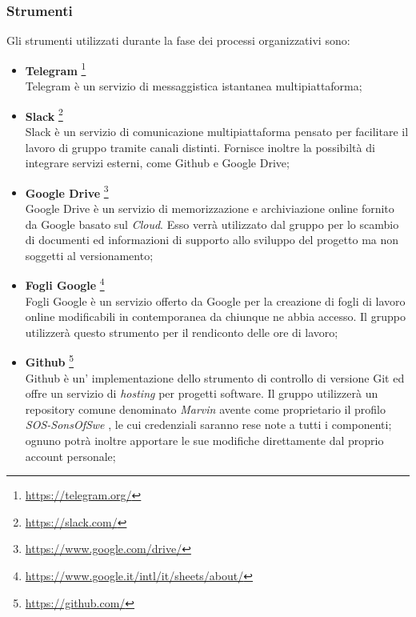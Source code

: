 \subsubsection{Strumenti}
Gli strumenti utilizzati durante la fase dei processi organizzativi sono:
\begin{itemize}
\item \textbf{Telegram}	\footnote{\href{https://telegram.org/}{https://telegram.org/}}
	~\\Telegram è un servizio di messaggistica istantanea multipiattaforma;
	
\item \textbf{Slack} \footnote{\href{https://slack.com/}{https://slack.com/}}
	~\\Slack è un servizio di comunicazione multipiattaforma pensato per facilitare il lavoro di gruppo tramite canali distinti. Fornisce inoltre la possibiltà di integrare servizi esterni, come Github e Google Drive;

\item \textbf{Google Drive} \footnote{\href{https://www.google.com/drive/}{https://www.google.com/drive/}}
	~\\Google Drive è un servizio di memorizzazione e archiviazione online fornito da Google basato sul \emph{Cloud}. Esso verrà utilizzato dal gruppo per lo scambio di documenti ed informazioni di supporto allo sviluppo del progetto ma non soggetti al versionamento;
	

\item \textbf{Fogli Google}  \footnote{\href{https://www.google.it/intl/it/sheets/about/}{https://www.google.it/intl/it/sheets/about/}}
	~\\Fogli Google è un servizio offerto da Google per la creazione di fogli di lavoro online modificabili in contemporanea da chiunque ne abbia accesso. Il gruppo utilizzerà questo strumento per il rendiconto delle ore di lavoro;
	
\item \textbf{Github}	\footnote{\href{https://github.com/}{https://github.com/}}
	~\\Github è un' implementazione dello strumento di controllo di versione Git ed offre un servizio di \emph{hosting} per progetti software. Il gruppo utilizzerà un repository comune denominato \textit{Marvin} avente come proprietario il profilo \textit{SOS-SonsOfSwe} , le cui credenziali saranno rese note a tutti i componenti; ognuno potrà inoltre apportare le sue modifiche direttamente dal proprio account personale;
	

\end{itemize}
